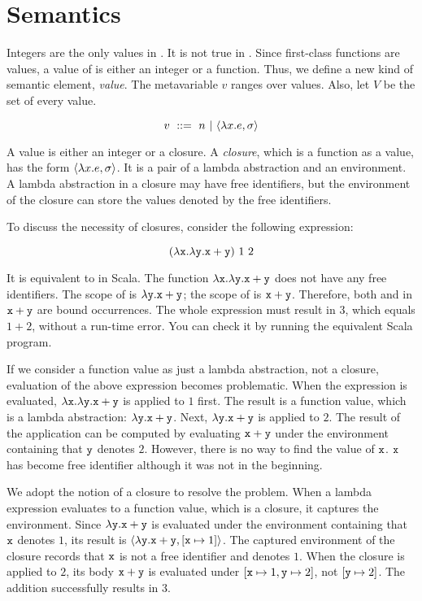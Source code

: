 \section{Semantics}

Integers are the only values in \plang. It is not true in \lang. Since
first-class functions are values, a value of \lang is either an integer or a
function. Thus, we define a new kind of semantic element,
\textit{value}. The
metavariable $v$ ranges over values. Also, let $V$ be the set of every value.

\[ v\ ::=\ n\ |\ \clov{x}{e}{\sigma} \]

A value is either an integer or a closure. A \textit{closure}, which is a
function as a value, has the form $\langle\lambda x.e,\sigma\rangle$.
It is a pair of a lambda abstraction and an environment.
A lambda abstraction in a closure may have free identifiers,
but the environment of the closure can store the values denoted by the
free identifiers.

To discuss the necessity of closures, consider the following expression:

\[(\lambda\texttt{x}.\lambda\texttt{y}.\texttt{x}+\texttt{y})\ 1\ 2\]

It is equivalent to  in Scala.
The function $\lambda\texttt{x}.\lambda\texttt{y}.\texttt{x}+\texttt{y}$ does not have any free
identifiers. The scope of  is ${\lambda\texttt{y}.\texttt{x}+\texttt{y}}$; the scope
of  is ${\texttt{x}+\texttt{y}}$. Therefore, both  and  in
$\texttt{x}+\texttt{y}$ are bound occurrences. The whole expression must result in $3$,
which equals $1+2$, without a run-time error. You can check it by running the
equivalent Scala program.

If we consider a function value as just a lambda abstraction, not a closure,
evaluation of the above expression becomes problematic.
When the expression is evaluated, $\lambda\texttt{x}.\lambda\texttt{y}.\texttt{x}+\texttt{y}$ is
applied to $1$ first. The result is a function value, which is a lambda
abstraction: $\lambda\texttt{y}.\texttt{x}+\texttt{y}$. Next, $\lambda\texttt{y}.\texttt{x}+\texttt{y}$
is applied to $2$. The result of the application can be computed by evaluating
$\texttt{x}+\texttt{y}$ under the environment containing that $\texttt{y}$ denotes $2$.
However, there is no way to find the value of $\texttt{x}$. $\texttt{x}$ has become free
identifier although it was not in the beginning.

We adopt the notion of a closure to resolve the problem. When a lambda
expression evaluates to a function value, which is a closure, it captures the
environment. Since $\lambda\texttt{y}.\texttt{x}+\texttt{y}$ is evaluated under the
environment containing that $\texttt{x}$ denotes $1$, its result is
$\langle\lambda\texttt{y}.\texttt{x}+\texttt{y},[\texttt{x}\mapsto1]\rangle$. The captured environment of the
closure records that $\texttt{x}$ is not a free identifier and denotes $1$.
When the closure is applied to $2$, its body ${\texttt{x}+\texttt{y}}$ is evaluated
under $[\texttt{x}\mapsto1,\texttt{y}\mapsto2]$, not $[\texttt{y}\mapsto2]$. The addition
successfully results in $3$.

